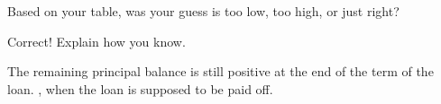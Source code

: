 \documentclass[handout,space,nooutcomes]{ximera}
\begin{document}
\begin{question}
Based on your table, was your guess is too low, too high, or just
right?  
\begin{multipleChoice}
\end{multipleChoice}
\vfill
\begin{question}
Correct!  Explain how you know. 
 \begin{freeResponse}
 
\end{freeResponse}
\begin{hint}
The remaining principal balance is still positive at the end of the term of the loan.  , when the loan is supposed to be paid off.    
\end{hint}
\end{question}
\end{question}
%
%
\end{document}
